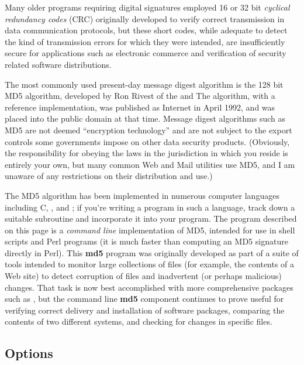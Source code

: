 Many older programs requiring digital signatures employed 16 or 32 bit {\it
cyclical redundancy codes} (CRC) originally developed to verify correct
transmission in data communication protocols, but these short codes, while
adequate to detect the kind of transmission errors for which they were
intended, are insufficiently secure for applications such as electronic
commerce and verification of security related software distributions.

The most commonly used present-day message digest algorithm is the 128 bit MD5
algorithm, developed by Ron Rivest of the
 and
 The algorithm, with a
reference implementation, was published as Internet
 in April 1992, and
was placed into the public domain at that time. Message digest algorithms such
as MD5 are not deemed ``encryption technology'' and are not subject to the
export controls some governments impose on other data security products.
(Obviously, the responsibility for obeying the laws in the jurisdiction in
which you reside is entirely your own, but many common Web and Mail utilities
use MD5, and I am unaware of any restrictions on their distribution and use.)

The MD5 algorithm has been implemented in numerous computer languages
including C,
, and
; if you're writing a program in such a
language, track down a suitable subroutine and incorporate it into your
program. The program described on this page is a {\it command line}
implementation of MD5, intended for use in shell scripts and Perl programs (it
is much faster than computing an MD5 signature directly in Perl). This {\bf
md5} program was originally developed as part of a suite of tools intended to
monitor large collections of files (for example, the contents of a Web site)
to detect corruption of files and inadvertent (or perhaps malicious) changes.
That task is now best accomplished with more comprehensive packages such as
, but the
command line {\bf md5} component continues to prove useful for verifying
correct delivery and installation of software packages, comparing the contents
of two different systems, and checking for changes in specific files.

\subsection{Options}

